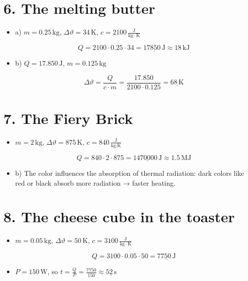 \documentclass[a4paper]{article}
\begin{document}
		\hrulefill
		
		\section*{6. The melting butter }
		
		\begin{itemize}
			\item a) \( m = 0{.}25\,\mathrm{kg} \), \( \Delta \vartheta = 34\,\mathrm{K} \), \( c = 2100 \,\frac{\mathrm{J}}{\mathrm{kg}\cdot\mathrm{K}}\)
			
			\[
			Q = 2100 \cdot 0{.}25 \cdot 34 = \underline{17850\,\text{J}}\approx 18 \,\text{kJ}
			\]
			
			\item b) \( Q = 17{.}850\,\mathrm{J} \), \( m = 0{.}125\,\mathrm{kg} \)
			
			\[
			\Delta \vartheta = \frac{Q}{c \cdot m} = \frac{17{.}850}{2100 \cdot 0{.}125} = \underline{68\,\text{K}}
			\]
		\end{itemize}
		
		\hrulefill
		
		\section*{7. The Fiery Brick }
		
		\begin{itemize}
			\item \( m = 2\,\text{kg} \), \( \Delta \vartheta = 875\,\text{K} \), \( c = 840\,\frac{\text{J}}{\text{kg}\cdot\text{K}} \)
			
			\[
			Q = 840 \cdot 2 \cdot 875 = \underline{1470000\,\text{J}}\approx 1.5 \,\text{MJ}
			\]
			
			\item b) The color influences the absorption of thermal radiation: dark colors like red or black absorb more radiation → faster heating.
		\end{itemize}
		
		\hrulefill
		
		\section*{8. The cheese cube in the toaster }
		
		\begin{itemize}
			\item \( m = 0{.}05\,\mathrm{kg} \), \( \Delta \vartheta = 50\,\mathrm{K} \), \( c = 3100 \,\frac{\mathrm{J}}{\mathrm{kg}\cdot\mathrm{K}}\)
			
			\[
			Q = 3100 \cdot 0{.}05 \cdot 50 = \underline{7750\,\text{J}}
			\]
			
			\item \( P = 150\,\text{W} \), so \( t = \frac{Q}{P} = \frac{7750}{150} \approx \underline{52\,\text{s}} \)
		\end{itemize}
		
\end{document}
